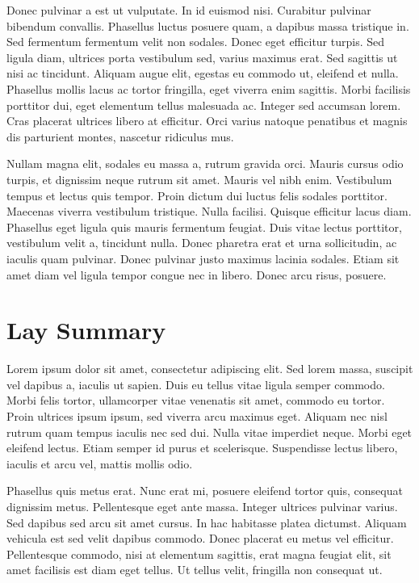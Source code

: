 \documentclass[
]{article}
\begin{document}
Donec pulvinar a est ut vulputate. In id euismod nisi. Curabitur pulvinar bibendum convallis. Phasellus luctus posuere quam, a dapibus massa tristique in. Sed fermentum fermentum velit non sodales. Donec eget efficitur turpis. Sed ligula diam, ultrices porta vestibulum sed, varius maximus erat. Sed sagittis ut nisi ac tincidunt. Aliquam augue elit, egestas eu commodo ut, eleifend et nulla. Phasellus mollis lacus ac tortor fringilla, eget viverra enim sagittis. Morbi facilisis porttitor dui, eget elementum tellus malesuada ac. Integer sed accumsan lorem. Cras placerat ultrices libero at efficitur. Orci varius natoque penatibus et magnis dis parturient montes, nascetur ridiculus mus.

Nullam magna elit, sodales eu massa a, rutrum gravida orci. Mauris cursus odio turpis, et dignissim neque rutrum sit amet. Mauris vel nibh enim. Vestibulum tempus et lectus quis tempor. Proin dictum dui luctus felis sodales porttitor. Maecenas viverra vestibulum tristique. Nulla facilisi. Quisque efficitur lacus diam. Phasellus eget ligula quis mauris fermentum feugiat. Duis vitae lectus porttitor, vestibulum velit a, tincidunt nulla. Donec pharetra erat et urna sollicitudin, ac iaculis quam pulvinar. Donec pulvinar justo maximus lacinia sodales. Etiam sit amet diam vel ligula tempor congue nec in libero. Donec arcu risus, posuere.

\clearpage

\section*{Lay Summary}

Lorem ipsum dolor sit amet, consectetur adipiscing elit. Sed lorem massa, suscipit vel dapibus a, iaculis ut sapien. Duis eu tellus vitae ligula semper commodo. Morbi felis tortor, ullamcorper vitae venenatis sit amet, commodo eu tortor. Proin ultrices ipsum ipsum, sed viverra arcu maximus eget. Aliquam nec nisl rutrum quam tempus iaculis nec sed dui. Nulla vitae imperdiet neque. Morbi eget eleifend lectus. Etiam semper id purus et scelerisque. Suspendisse lectus libero, iaculis et arcu vel, mattis mollis odio.

Phasellus quis metus erat. Nunc erat mi, posuere eleifend tortor quis, consequat dignissim metus. Pellentesque eget ante massa. Integer ultrices pulvinar varius. Sed dapibus sed arcu sit amet cursus. In hac habitasse platea dictumst. Aliquam vehicula est sed velit dapibus commodo. Donec placerat eu metus vel efficitur. Pellentesque commodo, nisi at elementum sagittis, erat magna feugiat elit, sit amet facilisis est diam eget tellus. Ut tellus velit, fringilla non consequat ut.
\end{document}
